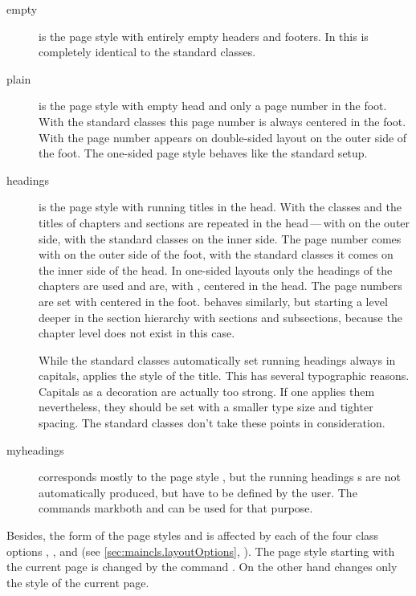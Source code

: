 \begin{description}
\item[\label{desc:maincls.pagestyle.empty}empty] is the page
  style with entirely empty headers and footers. In {\KOMAScript} this is
  completely identical to the standard classes.
\item [plain] is the page style with empty head and only a page number
  in the foot. With the standard classes this page number is
  always centered in the foot. With {\KOMAScript} the page number
  appears on double-sided layout on the outer
  side of the foot. The one-sided page style behaves like the
  standard setup.
\item[headings] is the page style with running titles in the head.
  With the classes  and
   the titles of chapters and
  sections are repeated in the head\,---\,with {\KOMAScript} on the outer
  side, with the standard classes on the inner side.  The page number
  comes with {\KOMAScript} on the outer side of the foot, with the
  standard classes it comes on the inner side of the head.  In
  one-sided layouts only the headings of the chapters are used and
  are, with {\KOMAScript}, centered in the head. The page numbers are
  set with {\KOMAScript} centered in the foot.
  behaves similarly, but starting a level deeper in the section
  hierarchy with sections and subsections, because the chapter level
  does not exist in this case.

  While the standard classes automatically set running headings always
  in capitals, {\KOMAScript} applies the style of the title. This has
  several typographic reasons. Capitals as a decoration are actually
  too strong. If one applies them nevertheless, they should be set
  with a smaller type size and tighter spacing. The standard classes
  don't take these points in consideration.
\item [myheadings] corresponds mostly to the page style
  , but the running headings s are not automatically
  produced, but have to be defined by the user. The commands \Macro
  {markboth} and
   can be used for that purpose.
\end{description}
Besides, the form of the page styles  and
 is affected by each of the four class options
, ,  and
 (see \autoref{sec:maincls.layoutOptions},
).
The page style starting with the current page is changed by the
command .  On the other hand 
changes only the style of the current page.

